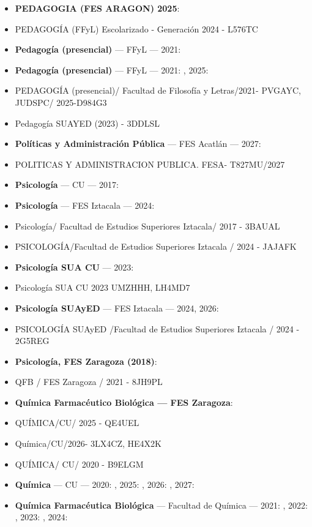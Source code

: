 \begin{itemize}[leftmargin=*]
  \item \textbf{PEDAGOGIA (FES ARAGON) 2025}: 
  \item PEDAGOGÍA (FFyL) Escolarizado - Generación 2024 - L576TC
  \item \textbf{Pedagogía (presencial)} --- FFyL --- 2021: 
  \item \textbf{Pedagogía (presencial)} --- FFyL --- 2021: , 2025: 
  \item PEDAGOGÍA (presencial)/ Facultad de Filosofía y Letras/2021- PVGAYC, JUDSPC/ 2025-D984G3
  \item Pedagogía SUAYED (2023) - 3DDLSL
  \item \textbf{Políticas y Administración Pública} --- FES Acatlán --- 2027: 
  \item POLITICAS Y ADMINISTRACION PUBLICA. FESA- T827MU/2027
  \item \textbf{Psicología} --- CU --- 2017: 
  \item \textbf{Psicología} --- FES Iztacala --- 2024: 
  \item Psicología/ Facultad de Estudios Superiores Iztacala/ 2017 - 3BAUAL
  \item PSICOLOGÍA/Facultad de Estudios Superiores Iztacala / 2024 - JAJAFK
  \item \textbf{Psicología SUA CU} --- 2023: 
  \item Psicología SUA CU 2023 UMZHHH, LH4MD7
  \item \textbf{Psicología SUAyED} --- FES Iztacala --- 2024, 2026: 
  \item PSICOLOGÍA SUAyED /Facultad de Estudios Superiores Iztacala / 2024 - 2G5REG
  \item \textbf{Psicología, FES Zaragoza (2018)}: 
  \item QFB / FES Zaragoza / 2021 - 8JH9PL
  \item \textbf{Quí­mica Farmacéutico Biológica --- FES Zaragoza}: 
  \item QUÍMICA/CU/ 2025 - QE4UEL
  \item Química/CU/2026- 3LX4CZ, HE4X2K
  \item QUÍMICA/ CU/ 2020 - B9ELGM
  \item \textbf{Química} --- CU --- 2020: , 2025: , 2026: , 2027: 
  \item \textbf{Química Farmacéutica Biológica} --- Facultad de Química --- 2021: , 2022: , 2023: , 2024: 

\end{itemize}

